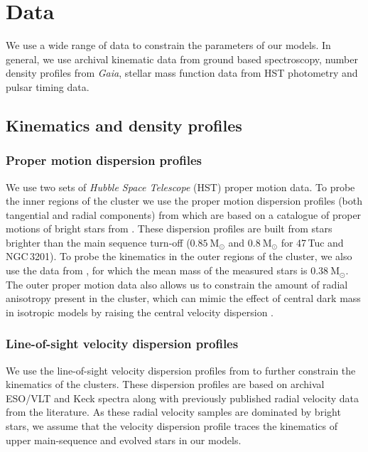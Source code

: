 \newcommand{\evolvemf}{\code{evolve\_mf}}



\section{Data}


We use a wide range of data to constrain the parameters of our models. In general, we use archival
kinematic data from ground based spectroscopy, number density profiles from \emph{Gaia}, stellar
mass function data from HST photometry and pulsar timing data.

\subsection{Kinematics and density profiles}

\subsubsection{Proper motion dispersion profiles}

We use two sets of {\it Hubble Space Telescope} (HST) proper motion data. To probe the inner regions
of the cluster we use the proper motion dispersion profiles (both tangential and radial components)
from \citet{Watkins2015} which are based on a catalogue of proper motions of bright stars from
\citet{Bellini2014}. These dispersion profiles are built from stars brighter than the main sequence
turn-off ($0.85 \ \mathrm{M}_\odot$ and $0.8 \ \mathrm{M}_\odot$ for 47\,Tuc and NGC\,3201). To
probe the kinematics in the outer regions of the cluster, we also use the data from
\citet{Heyl2017}, for which the mean mass of the measured stars is $0.38 \ \mathrm{M}_{\odot}$. The
outer proper motion data also allows us to constrain the amount of radial anisotropy present in the
cluster, which can mimic the effect of central dark mass in isotropic models by raising the central
velocity dispersion \citep{Zocchi2017}.


\subsubsection{Line-of-sight velocity dispersion profiles}

We use the line-of-sight velocity dispersion profiles from \citet{Baumgardt2018} to further
constrain the kinematics of the clusters. These dispersion profiles are based on archival ESO/VLT
and Keck spectra along with previously published radial velocity data from the literature. As these
radial velocity samples are dominated by bright stars, we assume that the velocity dispersion
profile traces the kinematics of upper main-sequence and evolved stars in our models.

